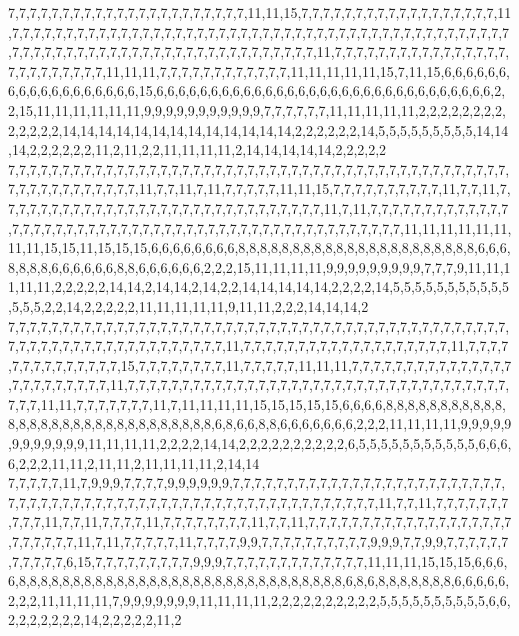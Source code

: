 7,7,7,7,7,7,7,7,7,7,7,7,7,7,7,7,7,7,7,7,7,7,11,11,15,7,7,7,7,7,7,7,7,7,7,7,7,7,7,7,7,7,7,11,7,7,7,7,7,7,7,7,7,7,7,7,7,7,7,7,7,7,7,7,7,7,7,7,7,7,7,7,7,7,7,7,7,7,7,7,7,7,7,7,7,7,7,7,7,7,7,7,7,7,7,7,7,7,7,7,7,7,7,7,7,7,7,7,7,7,7,7,7,7,7,7,7,7,11,7,7,7,7,7,7,7,7,7,7,7,7,7,7,7,7,7,7,7,7,7,7,7,7,7,11,11,11,7,7,7,7,7,7,7,7,7,7,7,7,11,11,11,11,11,15,7,11,15,6,6,6,6,6,6,6,6,6,6,6,6,6,6,6,6,6,6,15,6,6,6,6,6,6,6,6,6,6,6,6,6,6,6,6,6,6,6,6,6,6,6,6,6,6,6,6,6,6,6,2,2,15,11,11,11,11,11,11,9,9,9,9,9,9,9,9,9,9,9,7,7,7,7,7,7,11,11,11,11,11,2,2,2,2,2,2,2,2,2,2,2,2,2,14,14,14,14,14,14,14,14,14,14,14,14,14,2,2,2,2,2,2,14,5,5,5,5,5,5,5,5,5,14,14,14,2,2,2,2,2,2,11,2,11,2,2,11,11,11,11,2,14,14,14,14,14,2,2,2,2,2
7,7,7,7,7,7,7,7,7,7,7,7,7,7,7,7,7,7,7,7,7,7,7,7,7,7,7,7,7,7,7,7,7,7,7,7,7,7,7,7,7,7,7,7,7,7,7,7,7,7,7,7,7,7,7,7,7,7,11,7,7,11,7,11,7,7,7,7,7,11,11,15,7,7,7,7,7,7,7,7,7,7,11,7,7,11,7,7,7,7,7,7,7,7,7,7,7,7,7,7,7,7,7,7,7,7,7,7,7,7,7,7,7,7,7,7,11,7,11,7,7,7,7,7,7,7,7,7,7,7,7,7,7,7,7,7,7,7,7,7,7,7,7,7,7,7,7,7,7,7,7,7,7,7,7,7,7,7,7,7,7,7,7,7,7,7,7,7,11,11,11,11,11,11,11,11,15,15,11,15,15,15,6,6,6,6,6,6,6,6,8,8,8,8,8,8,8,8,8,8,8,8,8,8,8,8,8,8,8,8,8,8,6,6,6,8,8,8,8,6,6,6,6,6,6,8,8,6,6,6,6,6,6,2,2,2,15,11,11,11,11,9,9,9,9,9,9,9,9,9,7,7,7,9,11,11,11,11,11,2,2,2,2,2,14,14,2,14,14,2,14,2,2,14,14,14,14,14,2,2,2,2,14,5,5,5,5,5,5,5,5,5,5,5,5,5,5,2,2,14,2,2,2,2,2,11,11,11,11,11,9,11,11,2,2,2,14,14,14,2
7,7,7,7,7,7,7,7,7,7,7,7,7,7,7,7,7,7,7,7,7,7,7,7,7,7,7,7,7,7,7,7,7,7,7,7,7,7,7,7,7,7,7,7,7,7,7,7,7,7,7,7,7,7,7,7,7,7,7,7,7,7,7,7,7,7,11,7,7,7,7,7,7,7,7,7,7,7,7,7,7,7,7,7,7,7,11,7,7,7,7,7,7,7,7,7,7,7,7,7,7,15,7,7,7,7,7,7,7,7,11,7,7,7,7,7,11,11,11,7,7,7,7,7,7,7,7,7,7,7,7,7,7,7,7,7,7,7,7,7,7,7,7,11,7,7,7,7,7,7,7,7,7,7,7,7,7,7,7,7,7,7,7,7,7,7,7,7,7,7,7,7,7,7,7,7,7,7,7,7,7,7,11,11,7,7,7,7,7,7,7,11,7,11,11,11,11,15,15,15,15,15,6,6,6,6,8,8,8,8,8,8,8,8,8,8,8,8,8,8,8,8,8,8,8,8,8,8,8,8,8,8,8,8,8,8,6,8,6,6,8,8,6,6,6,6,6,6,6,2,2,2,11,11,11,11,9,9,9,9,9,9,9,9,9,9,9,9,11,11,11,11,2,2,2,2,14,14,2,2,2,2,2,2,2,2,2,2,6,5,5,5,5,5,5,5,5,5,5,5,6,6,6,6,2,2,2,11,11,2,11,11,2,11,11,11,11,2,14,14
7,7,7,7,7,11,7,9,9,9,7,7,7,7,9,9,9,9,9,9,7,7,7,7,7,7,7,7,7,7,7,7,7,7,7,7,7,7,7,7,7,7,7,7,7,7,7,7,7,7,7,7,7,7,7,7,7,7,7,7,7,7,7,7,7,7,7,7,7,7,7,7,7,7,7,7,7,7,7,11,7,7,11,7,7,7,7,7,7,7,7,7,7,11,7,7,11,7,7,7,7,11,7,7,7,7,7,7,7,7,11,7,7,11,7,7,7,7,7,7,7,7,7,7,7,7,7,7,7,7,7,7,7,7,7,7,7,7,7,11,7,11,7,7,7,7,7,11,7,7,7,7,9,9,7,7,7,7,7,7,7,7,7,7,9,9,9,7,7,9,9,7,7,7,7,7,7,7,7,7,7,7,6,15,7,7,7,7,7,7,7,7,7,9,9,9,7,7,7,7,7,7,7,7,7,7,7,7,7,11,11,11,15,15,15,6,6,6,6,8,8,8,8,8,8,8,8,8,8,8,8,8,8,8,8,8,8,8,8,8,8,8,8,8,8,8,8,8,8,6,8,6,8,8,8,8,8,8,8,6,6,6,6,6,2,2,2,11,11,11,11,7,9,9,9,9,9,9,9,11,11,11,11,2,2,2,2,2,2,2,2,2,2,5,5,5,5,5,5,5,5,5,5,6,6,2,2,2,2,2,2,2,14,2,2,2,2,2,11,2
